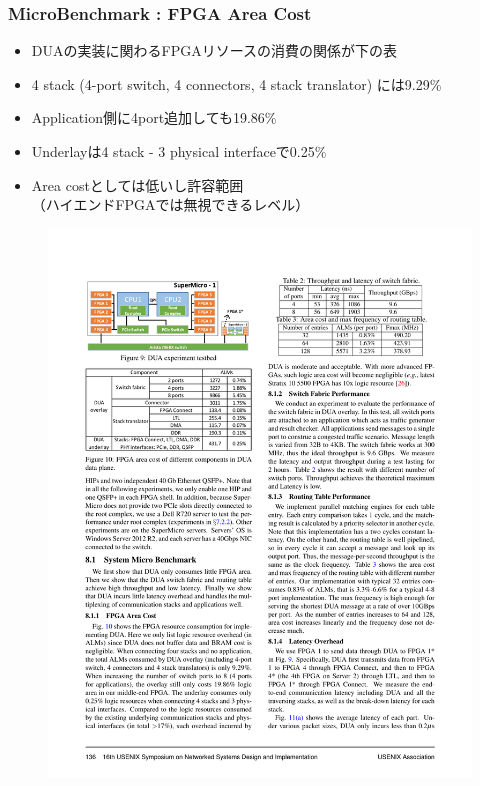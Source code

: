 \documentclass[dvipdfmx,9pt,notheorems]{beamer}
\theoremstyle{definition}
\begin{document}
\begin{frame}\frametitle{MicroBenchmark : FPGA Area Cost}
	\begin{itemize}
			\item DUAの実装に関わるFPGAリソースの消費の関係が下の表
			\item 4 stack (4-port switch, 4 connectors, 4 stack translator) には9.29\%
			\item Application側に4port追加しても19.86\%
			\item Underlayは4 stack - 3 physical interfaceで0.25\%
			\item Area costとしては低いし許容範囲\\（ハイエンドFPGAでは無視できるレベル）
	\end{itemize}
  \begin{figure}[htb]
		\includegraphics[scale=1.0]{fig/figure10.pdf}
  \end{figure}
\end{frame}
\end{document}
